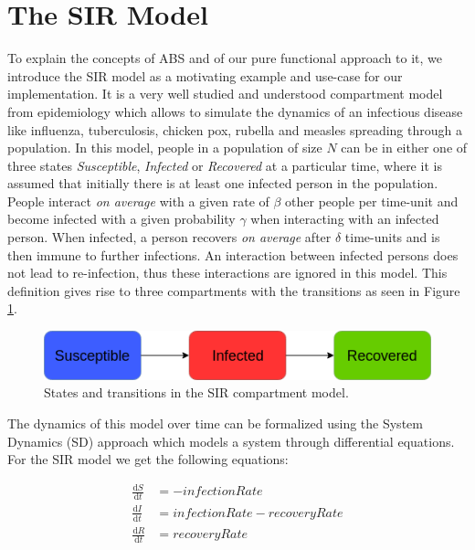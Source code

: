 \section{The SIR Model}
To explain the concepts of ABS and of our pure functional approach to it, we introduce the SIR model as a motivating example and use-case for our implementation. It is a very well studied and understood compartment model from epidemiology \cite{kermack_contribution_1927} which allows to simulate the dynamics of an infectious disease like influenza, tuberculosis, chicken pox, rubella and measles \cite{enns_its_2010} spreading through a population. In this model, people in a population of size $N$ can be in either one of three states \textit{Susceptible}, \textit{Infected} or \textit{Recovered} at a particular time, where it is assumed that initially there is at least one infected person in the population. People interact \textit{on average} with a given rate of $\beta$ other people per time-unit and become infected with a given probability $\gamma$ when interacting with an infected person. When infected, a person recovers \textit{on average} after $\delta$ time-units and is then immune to further infections. An interaction between infected persons does not lead to re-infection, thus these interactions are ignored in this model. This definition gives rise to three compartments with the transitions as seen in Figure \ref{fig:sir_transitions}.

\begin{figure}
	\centering
	\includegraphics[width=.4\textwidth, angle=0]{./fig/diagrams/SIR_transitions.png}
	\caption{States and transitions in the SIR compartment model.}
	\label{fig:sir_transitions}
\end{figure}

The dynamics of this model over time can be formalized using the System Dynamics (SD) approach \cite{porter_industrial_1962} which models a system through differential equations. For the SIR model we get the following equations:

\begin{align}
\frac{\mathrm d S}{\mathrm d t} &= -infectionRate \\ 
\frac{\mathrm d I}{\mathrm d t} &= infectionRate - recoveryRate \\ 
\frac{\mathrm d R}{\mathrm d t} &= recoveryRate 
\end{align}

